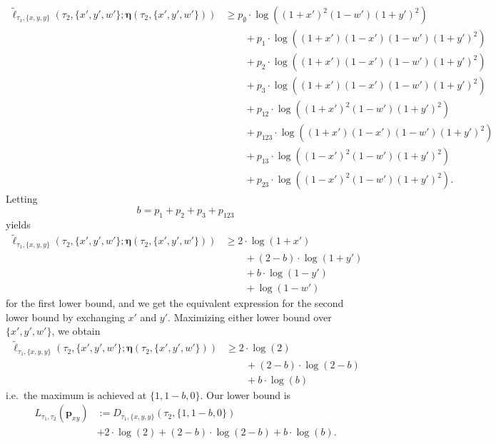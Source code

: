 \documentclass{article}
\newcommand{\fullAncestralSplitPartitions}{\boldsymbol\eta}
\newcommand{\shannonDivergence}{D}
\begin{document}
\begin{align*}
    \tilde{\ell}_{\tau_1,\{x,y,y\}}(\tau_2, \{x',y',w'\}; \fullAncestralSplitPartitions(\tau_2,\{x',y',w'\}))
    &\ge      p_{\emptyset}  \cdot\log((1+x')^2    (1-w')(1+y')^2) \\
    &\qquad + p_{1}          \cdot\log((1+x')(1-x')(1-w')(1+y')^2) \\
    &\qquad + p_{2}          \cdot\log((1+x')(1-x')(1-w')(1+y')^2) \\
    &\qquad + p_{3}          \cdot\log((1+x')(1-x')(1-w')(1+y')^2) \\
    &\qquad + p_{12}         \cdot\log((1+x')^2    (1-w')(1+y')^2) \\
    &\qquad + p_{123}        \cdot\log((1+x')(1-x')(1-w')(1+y')^2)\\
    &\qquad + p_{13}         \cdot\log((1-x')^2    (1-w')(1+y')^2) \\
    &\qquad + p_{23}         \cdot\log((1-x')^2    (1-w')(1+y')^2).
\end{align*}
Letting
$$
b = p_{1}+p_{2}+p_{3}+p_{123}
$$
yields
\begin{align*}
    \tilde{\ell}_{\tau_1,\{x,y,y\}}(\tau_2, \{x',y',w'\}; \fullAncestralSplitPartitions(\tau_2,\{x',y',w'\}))
    &\ge      2\cdot\log(1+x') \\
    &\qquad + (2-b)  \cdot\log(1+y') \\
    &\qquad + b      \cdot\log(1-y') \\
    &\qquad + \log(1-w')
\end{align*}
for the first lower bound, and we get the equivalent expression for the second lower bound by exchanging $x'$ and $y'$.
Maximizing either lower bound over $\{x',y',w'\}$, we obtain
\begin{align*}
    \tilde{\ell}_{\tau_1,\{x,y,y\}}(\tau_2, \{x',y',w'\}; \fullAncestralSplitPartitions(\tau_2,\{x',y',w'\}))
    &\ge      2\cdot\log(2) \\
    &\qquad + (2-b)  \cdot\log(2-b) \\
    &\qquad + b      \cdot\log(b)
\end{align*}
%
i.e.\ the maximum is achieved at $\{1,1-b,0\}$.
Our lower bound is
\begin{align*}
    L_{\tau_1,\tau_2}(\mathbf{p}_{xy}) &:= \shannonDivergence_{\tau_1,\{x,y,y\}}(\tau_2,\{1,1-b,0\}) \\
                                           &+ 2\cdot\log(2) + (2-b)  \cdot\log(2-b) + b      \cdot\log(b).
\end{align*}
\end{document}
